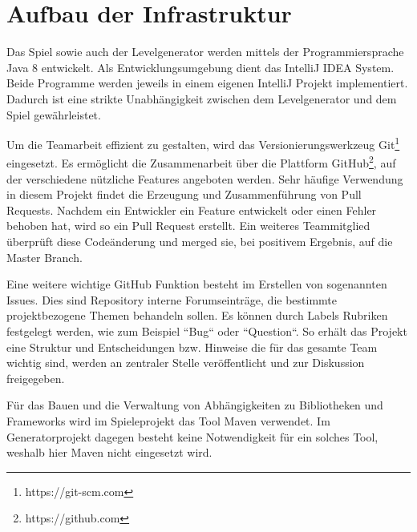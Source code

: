\section{Aufbau der Infrastruktur}

Das Spiel sowie auch der Levelgenerator werden mittels der Programmiersprache Java 8 entwickelt. 
Als Entwicklungsumgebung dient das IntelliJ IDEA System.
Beide Programme werden jeweils in einem eigenen IntelliJ Projekt implementiert.
Dadurch ist eine strikte Unabhängigkeit zwischen dem Levelgenerator und dem Spiel gewährleistet.

Um die Teamarbeit effizient zu gestalten, wird das Versionierungswerkzeug Git\footnote{https://git-scm.com} eingesetzt.
Es ermöglicht die Zusammenarbeit über die Plattform GitHub\footnote{https://github.com}, auf der verschiedene nützliche Features angeboten werden.
Sehr häufige Verwendung in diesem Projekt findet die Erzeugung und Zusammenführung von Pull Requests.
Nachdem ein Entwickler ein Feature entwickelt oder einen Fehler behoben hat, wird so ein Pull Request erstellt.
Ein weiteres Teammitglied überprüft diese Codeänderung und merged sie, bei positivem Ergebnis, auf die Master Branch.

Eine weitere wichtige GitHub Funktion besteht im Erstellen von sogenannten Issues.
Dies sind Repository interne Forumseinträge, die bestimmte projektbezogene Themen behandeln sollen.
Es können durch Labels Rubriken festgelegt werden, wie zum Beispiel ``Bug`` oder ``Question``.
So erhält das Projekt eine Struktur und Entscheidungen bzw. Hinweise die für das gesamte Team wichtig sind, werden an zentraler Stelle veröffentlicht und zur Diskussion freigegeben.

Für das Bauen und die Verwaltung von Abhängigkeiten zu Bibliotheken und Frameworks wird im Spieleprojekt das Tool Maven verwendet.
Im Generatorprojekt dagegen besteht keine Notwendigkeit für ein solches Tool, weshalb hier Maven nicht eingesetzt wird.
